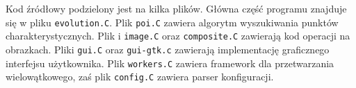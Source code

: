\documentclass[a4paper,12pt,leqno]{article}
\begin{document}
Kod źródłowy podzielony jest na kilka plików. Główna część programu znajduje się w pliku \texttt{evolution.C}. Plik \texttt{poi.C} zawiera algorytm
wyszukiwania punktów charakterystycznych. Plik i \texttt{image.C} oraz \texttt{composite.C} zawierają kod operacji na obrazkach. Pliki \texttt{gui.C}
oraz \texttt{gui-gtk.c} zawierają implementację graficznego interfejsu użytkownika. Plik \texttt{workers.C} zawiera framework dla przetwarzania
wielowątkowego, zaś plik \texttt{config.C} zawiera parser konfiguracji.
\end{document}
